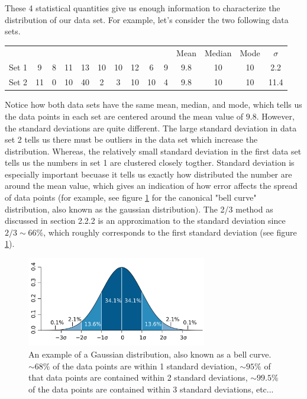 These 4 statistical quantities give us enough information to characterize the distribution of our data set. For example, let's consider the two following data sets.
\myskip
\begin{center}
\begin{tabular}{c | c | c | c | c | c | c | c | c | c | c | c | c | c  }
&&&&&&&&&&Mean&Median&Mode& $\sigma$ \\
Set 1 & 9&8&11&13&10&10&12&6&9 &9.8&10&10&2.2\\
Set 2 & 11&0&10&40&2&3&10&10&4 &9.8&10&10&11.4
\end{tabular}
\end{center}
\myskip
Notice how both data sets have the same mean, median, and mode, which tells us the data points in each set are centered around the mean value of $9.8$. However, the standard deviations are quite different. The large standard deviation in data set 2 tells us there must be outliers in the data set which increase the distribution. Whereas, the relatively small standard deviation in the first data set tells us the numbers in set 1 are clustered closely togther. Standard deviation is especially important becuase it tells us exactly how distributed the number are around the mean value, which gives an indication of how error affects the spread of data points (for example, see figure \ref{fig:bellcurve} for the canonical "bell curve" distribution, also known as the gaussian distribution). The 2/3 method as discussed in section 2.2.2 is an approximation to the standard deviation since $2/3 \sim 66\%$, which roughly corresponds to the first standard deviation (see figure \ref{fig:bellcurve}).

\begin{figure}[h]
    \begin{center}
        \includegraphics[width=0.7\textwidth]{./Exp0/pic/image3.png}
    \end{center}
    \caption{An example of a Gaussian distribution, also known as a bell curve. $\sim 68\%$ of the data points are within 1 standard deviation, $\sim 95\%$ of that data points are contained within 2 standard deviations, $\sim 99.5 \%$ of the data points are contained within 3 standard deviations, etc...}
    \label{fig:bellcurve}
\end{figure}

